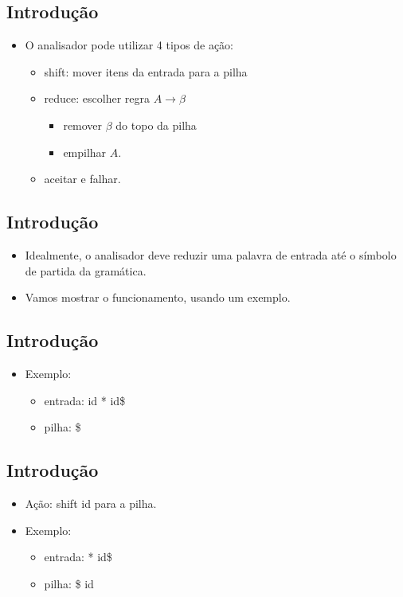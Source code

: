 \documentclass[11pt]{article}
\begin{document}
\subsection*{Introdução}
\label{sec:org740311a}

\begin{itemize}
\item O analisador pode utilizar 4 tipos de ação:
\begin{itemize}
\item shift: mover itens da entrada para a pilha
\item reduce: escolher regra \(A \to \beta\)
\begin{itemize}
\item remover \(\beta\) do topo da pilha
\item empilhar \(A\).
\end{itemize}
\item aceitar e falhar.
\end{itemize}
\end{itemize}
\subsection*{Introdução}
\label{sec:org0d95eb5}

\begin{itemize}
\item Idealmente, o analisador deve reduzir uma palavra de entrada até o símbolo de partida da gramática.

\item Vamos mostrar o funcionamento, usando um exemplo.
\end{itemize}
\subsection*{Introdução}
\label{sec:orgc101255}

\begin{itemize}
\item Exemplo:
\begin{itemize}
\item entrada: id * id\$
\item pilha: \$
\end{itemize}
\end{itemize}
\subsection*{Introdução}
\label{sec:org2975fdf}

\begin{itemize}
\item Ação: shift id para a pilha.

\item Exemplo:
\begin{itemize}
\item entrada: * id\$
\item pilha: \$ id
\end{itemize}
\end{itemize}
\end{document}
